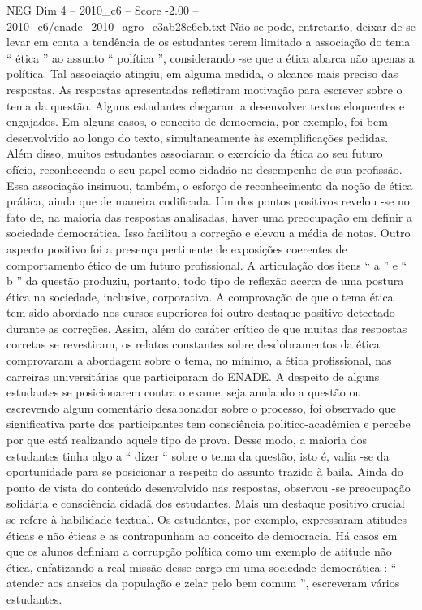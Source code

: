 \begin{textsample}{NEG Dim 4 – 2010\_c6 – Score -2.00 – 2010\_c6/enade\_2010\_agro\_c3ab28c6eb.txt}
Não se pode, entretanto, deixar de se levar em conta a tendência de os estudantes terem limitado a associação do tema “ ética ” ao assunto “ política ”, considerando -se que a ética abarca não apenas a política.
Tal associação atingiu, em alguma medida, o alcance mais preciso das respostas.
As respostas apresentadas refletiram motivação para escrever sobre o tema da questão.
Alguns estudantes chegaram a desenvolver textos eloquentes e engajados.
Em alguns casos, o conceito de democracia, por exemplo, foi bem desenvolvido ao longo do texto, simultaneamente às exemplificações pedidas.
Além disso, muitos estudantes associaram o exercício da ética ao seu futuro ofício, reconhecendo o seu papel como cidadão no desempenho de sua profissão.
Essa associação insinuou, também, o esforço de reconhecimento da noção de ética prática, ainda que de maneira codificada.
Um dos pontos positivos revelou -se no fato de, na maioria das respostas analisadas, haver uma preocupação em definir a sociedade democrática.
Isso facilitou a correção e elevou a média de notas.
Outro aspecto positivo foi a presença pertinente de exposições coerentes de comportamento ético de um futuro profissional.
A articulação dos itens “ a ” e “ b ” da questão produziu, portanto, todo tipo de reflexão acerca de uma postura ética na sociedade, inclusive, corporativa.
A comprovação de que o tema ética tem sido abordado nos cursos superiores foi outro destaque positivo detectado durante as correções.
Assim, além do caráter crítico de que muitas das respostas corretas se revestiram, os relatos constantes sobre desdobramentos da ética comprovaram a abordagem sobre o tema, no mínimo, a ética profissional, nas carreiras universitárias que participaram do ENADE.
A despeito de alguns estudantes se posicionarem contra o exame, seja anulando a questão ou escrevendo algum comentário desabonador sobre o processo, foi observado que significativa parte dos participantes tem consciência político-acadêmica e percebe por que está realizando aquele tipo de prova.
Desse modo, a maioria dos estudantes tinha algo a “ dizer “ sobre o tema da questão, isto é, valia -se da oportunidade para se posicionar a respeito do assunto trazido à baila.
Ainda do ponto de vista do conteúdo desenvolvido nas respostas, observou -se preocupação solidária e consciência cidadã dos estudantes.
Mais um destaque positivo crucial se refere à habilidade textual.
Os estudantes, por exemplo, expressaram atitudes éticas e não éticas e as contrapunham ao conceito de democracia.
Há casos em que os alunos definiam a corrupção política como um exemplo de atitude não ética, enfatizando a real missão desse cargo em uma sociedade democrática : “ atender aos anseios da população e zelar pelo bem comum ”, escreveram vários estudantes.

\end{textsample}
